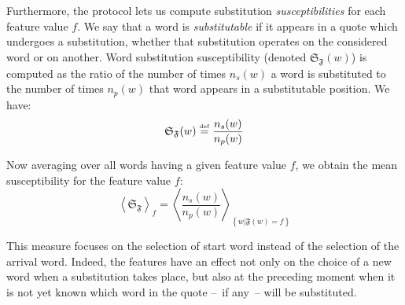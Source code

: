 Furthermore, the protocol lets us compute substitution \emph{susceptibilities} for each feature value $f$. 
We say that a word is \emph{substitutable} if it appears in a quote which undergoes a substitution, whether that substitution operates on the considered word or on another. 
Word substitution susceptibility (denoted $\mathfrak{S}_{\mathfrak{F}}(w)$) is computed as the ratio of the number of times $n_s(w)$ a word is substituted to the number of times $n_p(w)$ that word appears in a substitutable position.  We have:
$$\mathfrak{S}_{\mathfrak{F}}(w) \overset{\underset{\mathrm{def}}{}}{=} \frac{n_s(w)}{n_p(w)}$$

Now averaging over all words having a given feature value $f$, we obtain the mean susceptibility for the feature value $f$:
$$\left< \mathfrak{S}_{\mathfrak{F}} \right>_f = \left< \frac{n_s(w)}{n_p(w)} \right>_{\left\lbrace w | \mathfrak{F}(w) = f \right\rbrace}$$

This measure focuses on the selection of start word instead of the selection of the arrival word. Indeed, the features have an effect not only on the choice of a new word when a substitution takes place, but also at the preceding moment when it is not yet known which word in the quote --~if any~-- will be substituted. 


